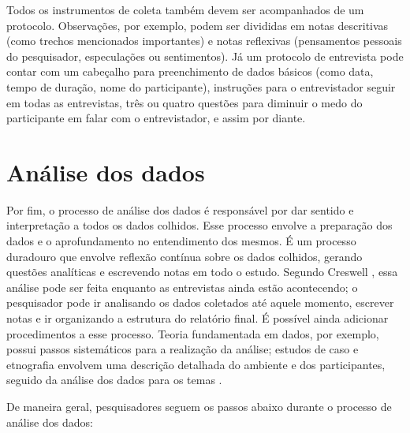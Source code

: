 Todos os instrumentos de coleta também devem ser acompanhados
de um protocolo. Observações, por exemplo, podem ser divididas em notas descritivas
(como trechos mencionados importantes) e notas reflexivas (pensamentos
pessoais do pesquisador, especulações ou sentimentos). Já um protocolo de
entrevista pode contar com um cabeçalho para preenchimento de dados básicos (como data, tempo
de duração, nome do participante), instruções para o entrevistador seguir em
todas as entrevistas, três ou quatro questões para diminuir o medo do participante em
falar com o entrevistador, e assim por diante. 

\section{Análise dos dados}

Por fim, o processo de análise dos dados é responsável por dar sentido e
interpretação a todos os dados colhidos. Esse processo envolve a preparação dos
dados e o aprofundamento no entendimento dos mesmos. É um processo duradouro que
envolve reflexão contínua sobre os dados colhidos, gerando questões analíticas e
escrevendo notas em todo o estudo. Segundo Creswell \cite{creswell}, essa
análise pode ser feita enquanto as entrevistas ainda estão acontecendo; o
pesquisador pode ir analisando os dados coletados até aquele momento,
escrever notas e ir organizando a estrutura do relatório final.
É possível ainda adicionar procedimentos a esse processo. Teoria fundamentada em
dados, por exemplo, possui passos sistemáticos para a realização da análise;
estudos de caso e etnografia envolvem uma descrição detalhada do ambiente e dos
participantes, seguido da análise dos dados para os temas \cite{stake}.

De maneira geral, pesquisadores seguem os passos abaixo durante o processo de
análise dos dados:

